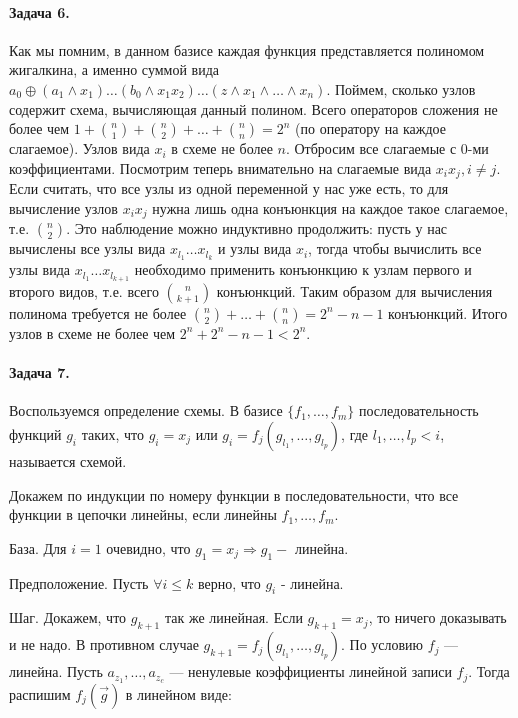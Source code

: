 \documentclass{article}
\begin{document}
    \paragraph{Задача 6.}
    Как мы помним, в данном базисе каждая функция представляется полиномом жигалкина, а именно суммой вида $a_0 \oplus (a_1 \wedge x_1) \ldots (b_0 \wedge x_1x_2) \ldots (z\wedge x_1 \wedge \ldots \wedge x_n)$. Поймем, сколько узлов содержит схема, вычисляющая данный полином. Всего операторов сложения не более чем $1 + {n \choose 1} + {n \choose 2} + \ldots + {n \choose n} = 2^n$ (по оператору на каждое слагаемое). Узлов вида $x_i$ в схеме не более $n$. Отбросим все слагаемые с 0-ми коэффициентами. Посмотрим теперь внимательно на слагаемые вида $x_ix_j, i \ne j$. Если считать, что все узлы из одной переменной у нас уже есть, то для вычисление узлов $x_ix_j$ нужна лишь одна конъюнкция на каждое такое слагаемое, т.е. ${n \choose 2}$. Это наблюдение можно индуктивно продолжить: пусть у нас вычислены все узлы вида $x_{l_1}\ldots x_{l_k}$ и узлы вида $x_i$, тогда чтобы вычислить все узлы вида $x_{l_1}\ldots x_{l_{k+1}}$ необходимо применить конъюнкцию к узлам первого и второго видов, т.е. всего ${n \choose k + 1}$ конъюнкций. Таким образом для вычисления полинома требуется не более ${n \choose 2} + \ldots + {n \choose n} = 2^n - n - 1$ конъюнкций. Итого узлов в схеме не более чем $2^n + 2^n - n - 1 < 2^n$.


    \paragraph{Задача 7.}
    Воспользуемся определение схемы. В базисе $\{f_1, \ldots, f_m\}$ последовательность функций $g_i$ таких, что $g_i = x_j$ или $g_i = f_j(g_{l_1}, \ldots, g_{l_p})$, где $l_1, \ldots, l_p < i$, называется схемой.

    Докажем по индукции по номеру функции в последовательности, что все функции в цепочки линейны, если линейны $f_1, \ldots , f_m$.

    База. Для $i = 1$ очевидно, что $g_1 = x_j \Rightarrow g_1 - $ линейна.

    Предположение. Пусть $\forall i \le k$ верно, что $g_i$ - линейна.

    Шаг. Докажем, что $g_{k + 1}$ так же линейная. Если $g_{k + 1} = x_j$, то ничего доказывать и не надо. В противном случае $g_{k + 1} = f_j(g_{l_1}, \ldots, g_{l_p})$. По условию $f_j$ --- линейна. Пусть $a_{z_1}, \ldots, a_{z_c}$ --- ненулевые коэффициенты линейной записи $f_j$. Тогда распишим $f_j(\vec{g})$ в линейном виде:
\end{document}
